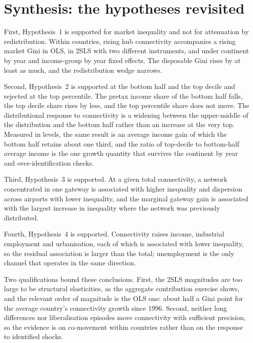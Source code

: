 \documentclass[12pt]{article}
\begin{document}
\section{Synthesis: the hypotheses revisited}
\label{sec:synthesis}
First, Hypothesis~1 is supported for market inequality and not for attenuation by redistribution. Within countries, rising hub connectivity accompanies a rising market Gini in OLS, in 2SLS with two different instruments, and under continent by year and income-group by year fixed effects. The disposable Gini rises by at least as much, and the redistribution wedge narrows.

Second, Hypothesis~2 is supported at the bottom half and the top decile and rejected at the top percentile. The pretax income share of the bottom half falls, the top decile share rises by less, and the top percentile share does not move. The distributional response to connectivity is a widening between the upper-middle of the distribution and the bottom half rather than an increase at the very top. Measured in levels, the same result is an average income gain of which the bottom half retains about one third, and the ratio of top-decile to bottom-half average income is the one growth quantity that survives the continent by year and over-identification checks.

Third, Hypothesis~3 is supported. At a given total connectivity, a network concentrated in one gateway is associated with higher inequality and dispersion across airports with lower inequality, and the marginal gateway gain is associated with the largest increase in inequality where the network was previously distributed.

Fourth, Hypothesis~4 is supported. Connectivity raises income, industrial employment and urbanisation, each of which is associated with lower inequality, so the residual association is larger than the total; unemployment is the only channel that operates in the same direction.

Two qualifications bound these conclusions. First, the 2SLS magnitudes are too large to be structural elasticities, as the aggregate contribution exercise shows, and the relevant order of magnitude is the OLS one: about half a Gini point for the average country's connectivity growth since 1996. Second, neither long differences nor liberalisation episodes move connectivity with sufficient precision, so the evidence is on co-movement within countries rather than on the response to identified shocks.
\end{document}
